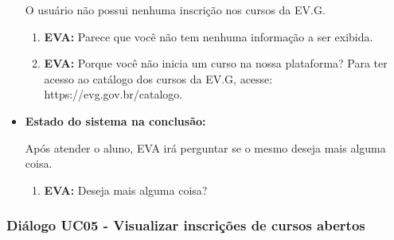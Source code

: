 \begin{itemize}
        O usuário não possui nenhuma inscrição nos cursos da EV.G.
        
        \begin{enumerate}
            \item \textbf{EVA:} Parece que você não tem nenhuma informação a ser exibida.
            \item \textbf{EVA:} Porque você não inicia um curso na nossa plataforma? Para ter acesso ao catálogo dos cursos da EV.G, acesse: https://evg.gov.br/catalogo.
        \end{enumerate}
    
    \item \textbf{Estado do sistema na conclusão:}
    
        Após atender o aluno, EVA irá perguntar se o mesmo deseja mais alguma coisa.
        
        \begin{enumerate}
            \item \textbf{EVA:} Deseja mais alguma coisa?
        \end{enumerate}
\end{itemize}


\subsubsection{Diálogo UC05 - Visualizar inscrições de cursos abertos}

